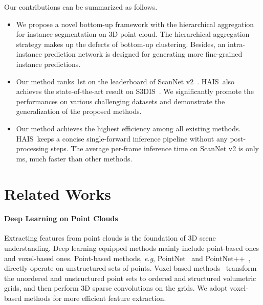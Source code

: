 \documentclass[10pt,twocolumn,letterpaper]{article}
\newcommand{\thename}{HAIS}
\def\eg{\emph{e.g}\onedot} \def\Eg{\emph{E.g}\onedot}
\begin{document}
Our contributions can be summarized as follows.
\begin{itemize}
\item We propose a novel bottom-up framework with the hierarchical aggregation for instance segmentation on 3D point cloud. The hierarchical aggregation strategy makes up the defects of bottom-up clustering. Besides, an intra-instance prediction network is designed for generating more fine-grained instance predictions.
\item Our method ranks 1st on the leaderboard of ScanNet v2~\cite{ScanNet}. \thename\ also achieves the state-of-the-art result on S3DIS~\cite{S3DIS}. We significantly promote the performances on various challenging datasets and demonstrate the generalization of the proposed methods.
\item  Our method achieves the highest efficiency among all existing methods. \thename\ keeps a concise single-forward inference pipeline without any post-processing steps. The average per-frame inference time on ScanNet v2 is only  ms, much faster than other methods. 
\end{itemize}


\section{Related Works}
\paragraph{Deep Learning on Point Clouds}
Extracting features from point clouds is the foundation of 3D scene understanding. Deep learning equipped methods mainly include point-based ones and voxel-based ones. Point-based methods, \eg, PointNet~\cite{PointNet} and PointNet++~\cite{PointNet++}, directly operate on unstructured sets of points. Voxel-based methods~\cite{Submanifold, OctNet, SEGCloud, VoxNet} transform the unordered and unstructured point sets to ordered and structured volumetric grids, and then perform 3D sparse convolutions on the grids. We adopt voxel-based methods for more efficient feature extraction.  
\end{document}
